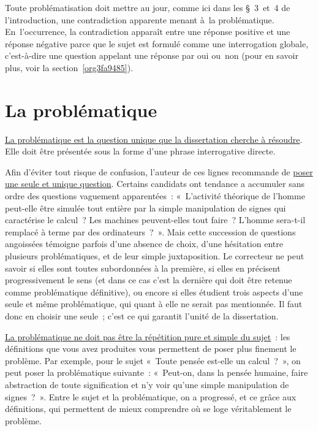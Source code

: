 \documentclass[a4paper,12pt]{report}
\begin{document}
Toute problématisation doit mettre au jour, comme ici dans les § 3 et 4
de l'introduction, une contradiction apparente menant à la
problématique. En l'occurrence, la contradiction apparaît entre une
réponse positive et une réponse négative parce que le sujet est formulé
comme une interrogation globale, c'est-à-dire une question appelant une
réponse par oui ou non (pour en savoir plus, voir la section \ref{org3fa9485}).


\section{La problématique}
\label{sec:orgd26b431}

\uline{La problématique est la question unique que la dissertation cherche à
résoudre}. Elle doit être présentée sous la forme d'une phrase
interrogative directe. 

Afin d'éviter tout risque de confusion, l'auteur de ces lignes
recommande de \uline{poser une seule et unique question}. Certains candidats
ont tendance a accumuler sans ordre des questions vaguement
apparentées : « L'activité théorique de l'homme peut-elle être simulée
tout entière par la simple manipulation de signes qui caractérise le
calcul ? Les machines peuvent-elles tout faire ? L'homme sera-t-il
remplacé à terme par des ordinateurs ? ». Mais cette succession de
questions angoissées témoigne parfois d'une absence de choix, d'une
hésitation entre plusieurs problématiques, et de leur simple
juxtaposition. Le correcteur ne peut savoir si elles sont toutes
subordonnées à la première, si elles en précisent progressivement le
sens (et dans ce cas c'est la dernière qui doit être retenue comme
problématique définitive), ou encore si elles étudient trois aspects
d'une seule et même problématique, qui quant à elle ne serait pas
mentionnée. Il faut donc en choisir une seule ; c'est ce qui garantit
l'unité de la dissertation.

\uline{La problématique ne doit pas être la répétition pure et simple du
sujet} : les définitions que vous avez produites vous permettent de
poser plus finement le problème. Par exemple, pour le sujet « Toute
pensée est-elle un calcul ? », on peut poser la problématique suivante :
« Peut-on, dans la pensée humaine, faire abstraction de toute
signification et n'y voir qu'une simple manipulation de signes ? ».
Entre le sujet et la problématique, on a progressé, et ce grâce aux
définitions, qui permettent de mieux comprendre où se loge véritablement
le problème.
\end{document}
